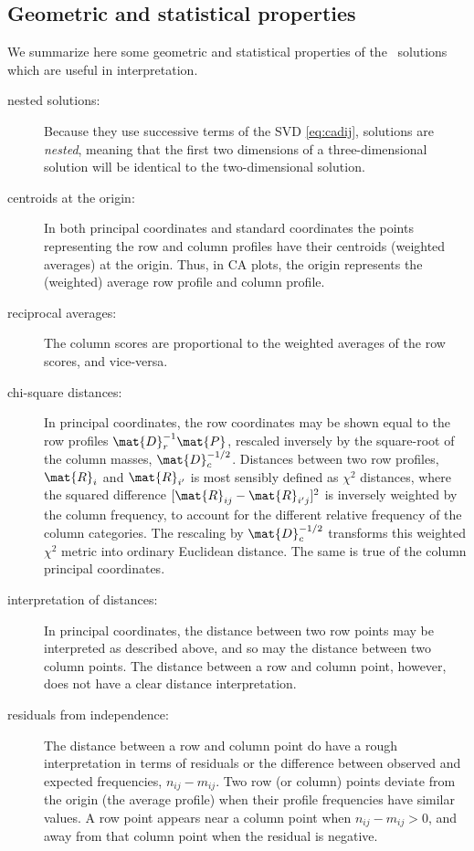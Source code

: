 \documentclass[11pt]{book}
\begin{document}
\subsection{Geometric and statistical properties}\label{sec:ca-properties}
We summarize here some geometric and statistical properties of the
\CA\ solutions which are useful in interpretation.

\begin{description}
\item[nested solutions:] Because they use successive terms of the SVD
  \eqref{eq:cadij}, \ca solutions are \emph{nested}, meaning that the first
  two dimensions of a three-dimensional solution will be identical
  to the two-dimensional solution.

\item[centroids at the origin:] In both principal coordinates and standard
coordinates the points representing the row and column profiles have their
centroids (weighted averages) at the origin.
Thus, in CA plots, the origin represents the (weighted) average
row profile and column profile.

\item[reciprocal averages:]
The column scores are proportional to the weighted averages of the row
scores, and vice-versa.

\item[chi-square distances:]  In principal coordinates, the row coordinates
may be shown equal to the row profiles $\mat{D}_r^{-1} \mat{P}$, rescaled inversely by the square-root of the column masses, $\mat{D}_c^{-1/2}$.
Distances between two row profiles, $\mat{R}_i$ and $\mat{R}_{i^\prime}$
is most sensibly defined as $\chi^2$ distances, where the squared
difference $[\mat{R}_{ij} -\mat{R}_{i^\prime j}]^2$ is inversely weighted
by the column frequency, to account for the different relative
frequency of the column categories.
The rescaling by $\mat{D}_c^{-1/2}$ transforms this weighted $\chi^2$
metric into ordinary Euclidean distance.
The same is true of the column principal coordinates.

\item[interpretation of distances:]
In principal coordinates,
the distance between two row points may be interpreted as described
above, and so may the distance between two column points.
The distance between a row and column point, however, does not have
a clear distance interpretation.

\item[residuals from independence:]
The distance between a row and column point do have a rough
interpretation in terms of residuals or the difference between
observed and expected frequencies, $n_{ij} - m_{ij}$.
Two row (or column) points deviate from the origin (the average
profile) when their profile frequencies have similar values.
A row point appears near a column point when  $n_{ij} - m_{ij} >
0$, and away from that column point when the residual is negative.
\end{description}
\end{document}
